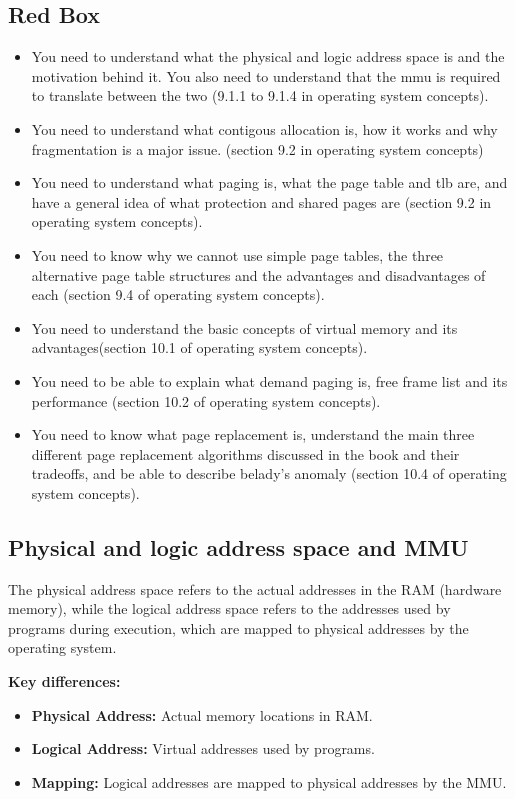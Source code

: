 \documentclass{article}
\begin{document}
\subsection{Red Box}
\begin{itemize}
    \item You need to understand what the physical and logic address space is and the motivation behind it. You also need to understand that
    the mmu is required to translate between the two (9.1.1 to 9.1.4 in operating system concepts).
    \item You need to understand what contigous allocation is, how it works and why fragmentation is a major issue.
    (section 9.2 in operating system concepts)
    \item You need to understand what paging is, what the page table and tlb are,
    and have a general idea of what protection and shared
    pages are (section 9.2 in operating system concepts).
    \item You need to know why we cannot use simple page tables, the three alternative page table structures and the advantages and
    disadvantages of each (section 9.4 of operating system concepts).
    \item You need to understand the basic concepts of virtual memory and its advantages(section 10.1 of operating system concepts).
    \item You need to be able to explain what demand paging is, free frame list and its performance (section 10.2 of operating system concepts).
    \item You need to know what page replacement is, understand the main three different page replacement algorithms discussed in the book
    and their tradeoffs, and be able to describe belady’s anomaly (section 10.4 of operating system concepts).
\end{itemize}


\subsection{Physical and logic address space and MMU}

The physical address space refers to the actual addresses in the RAM (hardware memory), 
while the logical address space refers to the addresses used by programs during execution, 
which are mapped to physical addresses by the operating system.
\newline

{\bf Key differences:}
\begin{itemize}
    \item {\bf Physical Address:} Actual memory locations in RAM.
    \item {\bf Logical Address:} Virtual addresses used by programs.
    \item {\bf Mapping: } Logical addresses are mapped to physical addresses by the MMU.
\end{itemize}
\end{document}
